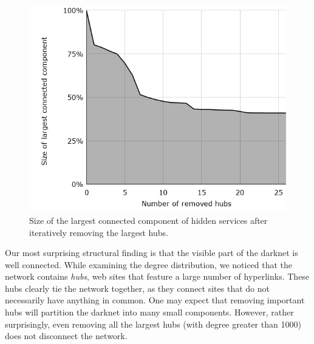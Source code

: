 \iflncs
  \begin{figure}
   \vspace{-15pt}
    \centering
    \includegraphics[trim={4.5cm 1cm 3cm 1cm}, width=0.65\linewidth]{images/LinkhubsRemoval.png}
    \caption{Size of the largest connected component of hidden services after iteratively removing the largest hubs.}
    \label{fig:largestConnectedComponent}
  \end{figure}
\fi
Our most surprising structural finding is that the visible part of the darknet is well connected. 
While examining the degree distribution, we noticed that the network contains \emph{hubs}, web sites that feature a large number of hyperlinks.  These hubs clearly tie the network together, as they connect sites that do not necessarily have anything in common.
One may expect that removing important hubs will partition the darknet into many small components. However, rather surprisingly, even removing all the largest hubs (with degree greater than 1000) does not disconnect the network.

